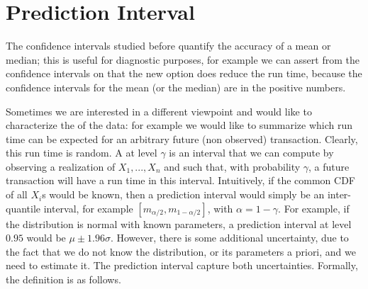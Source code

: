 \begin{figure}[!htbp]
%
%
\end{figure}
%
%

\section{Prediction Interval}

The confidence intervals studied before quantify the accuracy
of a mean or median; this is useful for diagnostic purposes,
for example we can assert from the confidence intervals on
 that the new option does reduce the run
time, because the confidence intervals for the mean (or the
median) are in the positive numbers.

Sometimes we are interested in a different viewpoint and would
like to characterize the  of the data: for
example we would like to summarize which run time can be
expected for an arbitrary future (non observed) transaction.
Clearly, this run time is random. A  at
level $\gamma$ is an interval that we can compute by observing
a realization of $X_1,...,X_n$ and such that, with probability
$\gamma$, a future transaction will have a run time in this
interval. Intuitively, if the common CDF of all $X_i$s would be
known, then a prediction interval would simply be an
inter-quantile interval, for example $[m_{\alpha/2},
m_{1-{\alpha/2}}]$, with $\alpha=1-\gamma$. For example, if the
distribution is normal with known parameters, a prediction
interval at level $0.95$ would be $\mu \pm 1.96 \sigma$.
However, there is some additional uncertainty, due to the fact
that we do not know the distribution, or its parameters a
priori, and we need to estimate it. The prediction interval
capture both uncertainties. Formally, the definition is as
follows.

